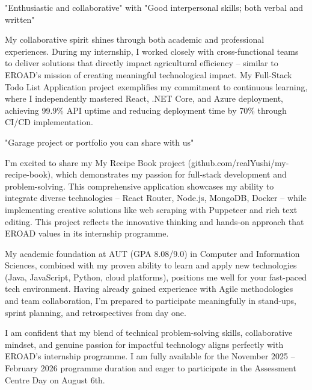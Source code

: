 \documentclass[11pt, a4paper]{awesome-cv}
\begin{document}
\begin{cvletter}
"Enthusiastic and collaborative" with "Good interpersonal skills; both verbal and written"

My collaborative spirit shines through both academic and professional experiences. During my internship, I worked closely with cross-functional teams to deliver solutions that directly impact agricultural efficiency -- similar to EROAD's mission of creating meaningful technological impact. My Full-Stack Todo List Application project exemplifies my commitment to continuous learning, where I independently mastered React, .NET Core, and Azure deployment, achieving 99.9\% API uptime and reducing deployment time by 70\% through CI/CD implementation.

"Garage project or portfolio you can share with us"

I'm excited to share my My Recipe Book project (github.com/realYushi/my-recipe-book), which demonstrates my passion for full-stack development and problem-solving. This comprehensive application showcases my ability to integrate diverse technologies -- React Router, Node.js, MongoDB, Docker -- while implementing creative solutions like web scraping with Puppeteer and rich text editing. This project reflects the innovative thinking and hands-on approach that EROAD values in its internship programme.

My academic foundation at AUT (GPA 8.08/9.0) in Computer and Information Sciences, combined with my proven ability to learn and apply new technologies (Java, JavaScript, Python, cloud platforms), positions me well for your fast-paced tech environment. Having already gained experience with Agile methodologies and team collaboration, I'm prepared to participate meaningfully in stand-ups, sprint planning, and retrospectives from day one.

I am confident that my blend of technical problem-solving skills, collaborative mindset, and genuine passion for impactful technology aligns perfectly with EROAD's internship programme. I am fully available for the November 2025 -- February 2026 programme duration and eager to participate in the Assessment Centre Day on August 6th.

\end{cvletter}


\makeletterclosing
\end{document}
